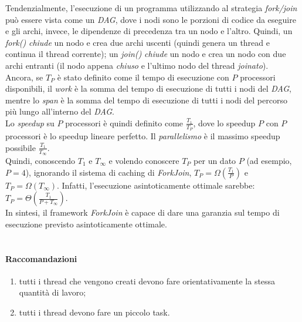 Tendenzialmente, l'esecuzione di un programma utilizzando al strategia \textit{fork/join} può essere vista come un \textit{DAG}, dove i nodi sono le porzioni di codice da eseguire e gli archi, invece, le dipendenze di precedenza tra un nodo e l'altro. Quindi, un \textit{fork()} \textit{chiude} un nodo e crea due archi uscenti (quindi genera un thread e continua il thread corrente); un \textit{join()} \textit{chiude} un nodo e crea un nodo con due archi entranti (il nodo appena \textit{chiuso} e l'ultimo nodo del thread \textit{joinato}). \\
Ancora, se $T_{P}$ è stato definito come il tempo di esecuzione con $P$ processori disponibili, il \textit{work} è la somma del tempo di esecuzione di tutti i nodi del \textit{DAG}, mentre lo \textit{span} è la somma del tempo di esecuzione di tutti i nodi del percorso più lungo all'interno del \textit{DAG}. \\
Lo \textit{speedup} su $P$ processori è quindi definito come $\frac{T_{1}}{T_{P}}$, dove lo speedup $P$ con $P$ processori è lo speedup lineare perfetto. Il \textit{parallelismo} è il massimo speedup possibile $\frac{T_{1}}{T_{\infty}}$. \\
Quindi, conoscendo $T_{1}$ e $T_{\infty}$ e volendo conoscere $T_{P}$ per un dato $P$ (ad esempio, $P=4$), ignorando il sistema di caching di \textit{ForkJoin}, $T_{P} = \Omega(\frac{T_{1}}{P})$ e $T_{P} = \Omega(T_{\infty})$. Infatti, l'esecuzione asintoticamente ottimale sarebbe: $T_{P} = \Theta(\frac{T_{1}}{P + T_{\infty}})$. \\
In sintesi, il framework \textit{ForkJoin} è capace di dare una garanzia sul tempo di esecuzione previsto asintoticamente ottimale. \\ \\

\paragraph{Raccomandazioni}
\begin{enumerate}
	\item tutti i thread che vengono creati devono fare orientativamente la stessa quantità di lavoro;
	\item tutti i thread devono fare un piccolo task.
\end{enumerate}
